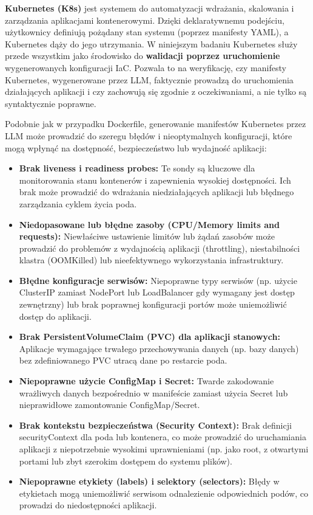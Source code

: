 \textbf{Kubernetes (K8s)} jest systemem do automatyzacji wdrażania, skalowania i zarządzania aplikacjami kontenerowymi. Dzięki deklaratywnemu podejściu, użytkownicy definiują pożądany stan systemu (poprzez manifesty YAML), a Kubernetes dąży do jego utrzymania. W niniejszym badaniu Kubernetes służy przede wszystkim jako środowisko do \textbf{walidacji poprzez uruchomienie} wygenerowanych konfiguracji IaC. Pozwala to na weryfikację, czy manifesty Kubernetes, wygenerowane przez LLM, faktycznie prowadzą do uruchomienia działających aplikacji i czy zachowują się zgodnie z oczekiwaniami, a nie tylko są syntaktycznie poprawne.

Podobnie jak w przypadku Dockerfile, generowanie manifestów Kubernetes przez LLM może prowadzić do szeregu błędów i nieoptymalnych konfiguracji, które mogą wpłynąć na dostępność, bezpieczeństwo lub wydajność aplikacji:
\begin{itemize}
\item \textbf{Brak liveness i readiness probes:} Te sondy są kluczowe dla monitorowania stanu kontenerów i zapewnienia wysokiej dostępności. Ich brak może prowadzić do wdrażania niedziałających aplikacji lub błędnego zarządzania cyklem życia poda.
\item \textbf{Niedopasowane lub błędne zasoby (CPU/Memory limits and requests):} Niewłaściwe ustawienie limitów lub żądań zasobów może prowadzić do problemów z wydajnością aplikacji (throttling), niestabilności klastra (OOMKilled) lub nieefektywnego wykorzystania infrastruktury.
\item \textbf{Błędne konfiguracje serwisów:} Niepoprawne typy serwisów (np. użycie ClusterIP zamiast NodePort lub LoadBalancer gdy wymagany jest dostęp zewnętrzny) lub brak poprawnej konfiguracji portów może uniemożliwić dostęp do aplikacji.
\item \textbf{Brak PersistentVolumeClaim (PVC) dla aplikacji stanowych:} Aplikacje wymagające trwałego przechowywania danych (np. bazy danych) bez zdefiniowanego PVC utracą dane po restarcie poda.
\item \textbf{Niepoprawne użycie ConfigMap i Secret:} Twarde zakodowanie wrażliwych danych bezpośrednio w manifeście zamiast użycia Secret lub nieprawidłowe zamontowanie ConfigMap/Secret.
\item \textbf{Brak kontekstu bezpieczeństwa (Security Context):} Brak definicji securityContext dla poda lub kontenera, co może prowadzić do uruchamiania aplikacji z niepotrzebnie wysokimi uprawnieniami (np. jako root, z otwartymi portami lub zbyt szerokim dostępem do systemu plików).
\item \textbf{Niepoprawne etykiety (labels) i selektory (selectors):} Błędy w etykietach mogą uniemożliwić serwisom odnalezienie odpowiednich podów, co prowadzi do niedostępności aplikacji.
\end{itemize}

